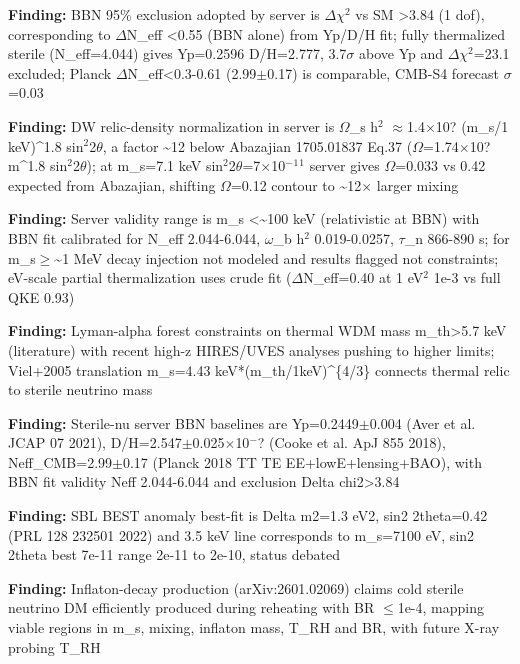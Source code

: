 \documentclass[11pt,a4paper]{article}
\begin{document}
\textbf{Finding:} BBN 95\% exclusion adopted by server is $\Delta$$\chi$$^2$ vs SM \textgreater{}3.84 (1 dof), corresponding to $\Delta$N\_eff \textless{}0.55 (BBN alone) from Yp/D/H fit; fully thermalized sterile (N\_eff=4.044) gives Yp=0.2596 D/H=2.777, 3.7$\sigma$ above Yp and $\Delta$$\chi$$^2$=23.1 excluded; Planck $\Delta$N\_eff\textless{}0.3-0.61 (2.99$\pm$0.17) is comparable, CMB-S4 forecast $\sigma$=0.03

\textbf{Finding:} DW relic-density normalization in server is $\Omega$\_s h$^2$ $\approx$1.4$\times$10? (m\_s/1 keV)\textasciicircum{}1.8 sin$^2$2$\theta$, a factor \textasciitilde{}12 below Abazajian 1705.01837 Eq.37 ($\Omega$=1.74$\times$10? m\textasciicircum{}1.8 sin$^2$2$\theta$); at m\_s=7.1 keV sin$^2$2$\theta$=7$\times$10$^-$$^1$$^1$ server gives $\Omega$=0.033 vs 0.42 expected from Abazajian, shifting $\Omega$=0.12 contour to \textasciitilde{}12$\times$ larger mixing

\textbf{Finding:} Server validity range is m\_s \textless{}\textasciitilde{}100 keV (relativistic at BBN) with BBN fit calibrated for N\_eff 2.044-6.044, $\omega$\_b h$^2$ 0.019-0.0257, $\tau$\_n 866-890 s; for m\_s$\geq$\textasciitilde{}1 MeV decay injection not modeled and results flagged not constraints; eV-scale partial thermalization uses crude fit ($\Delta$N\_eff=0.40 at 1 eV$^2$ 1e-3 vs full QKE 0.93)

\textbf{Finding:} Lyman-alpha forest constraints on thermal WDM mass m\_th\textgreater{}5.7 keV (literature) with recent high-z HIRES/UVES analyses pushing to higher limits; Viel+2005 translation m\_s=4.43 keV*(m\_th/1keV)\textasciicircum{}\{4/3\} connects thermal relic to sterile neutrino mass

\textbf{Finding:} Sterile-nu server BBN baselines are Yp=0.2449$\pm$0.004 (Aver et al. JCAP 07 2021), D/H=2.547$\pm$0.025$\times$10$^-$? (Cooke et al. ApJ 855 2018), Neff\_CMB=2.99$\pm$0.17 (Planck 2018 TT TE EE+lowE+lensing+BAO), with BBN fit validity Neff 2.044-6.044 and exclusion Delta chi2\textgreater{}3.84

\textbf{Finding:} SBL BEST anomaly best-fit is Delta m2=1.3 eV2, sin2 2theta=0.42 (PRL 128 232501 2022) and 3.5 keV line corresponds to m\_s=7100 eV, sin2 2theta best 7e-11 range 2e-11 to 2e-10, status debated

\textbf{Finding:} Inflaton-decay production (arXiv:2601.02069) claims cold sterile neutrino DM efficiently produced during reheating with BR $\leq$1e-4, mapping viable regions in m\_s, mixing, inflaton mass, T\_RH and BR, with future X-ray probing T\_RH
\end{document}
